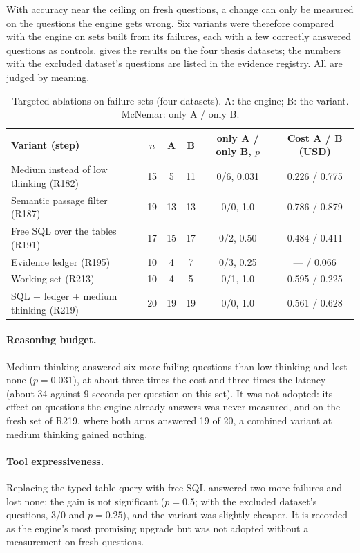 With accuracy near the ceiling on fresh questions, a change can only be measured on the questions the engine gets
wrong. Six variants were therefore compared with the engine on sets built from its failures, each with a few
correctly answered questions as controls.  gives the results on the four thesis datasets; the
numbers with the excluded dataset's questions are listed in the evidence registry. All are judged by meaning.

\begin{table}[htbp]
\centering
\caption{Targeted ablations on failure sets (four datasets). A: the engine; B: the variant. McNemar: only A / only B.}
\label{tab:ablations}
\small
\begin{tabularx}{\linewidth}{@{}>{\raggedright}Xccccc@{}}
\toprule
Variant (step) & $n$ & A & B & only A / only B, $p$ & Cost A / B (USD) \\
\midrule
Medium instead of low thinking (R182) & 15 & 5 & 11 & 0/6, 0.031 & 0.226 / 0.775 \\
Semantic passage filter (R187) & 19 & 13 & 13 & 0/0, 1.0 & 0.786 / 0.879 \\
Free SQL over the tables (R191) & 17 & 15 & 17 & 0/2, 0.50 & 0.484 / 0.411 \\
Evidence ledger (R195) & 10 & 4 & 7 & 0/3, 0.25 & --- / 0.066 \\
Working set (R213) & 10 & 4 & 5 & 0/1, 1.0 & 0.595 / 0.225 \\
SQL + ledger + medium thinking (R219) & 20 & 19 & 19 & 0/0, 1.0 & 0.561 / 0.628 \\
\bottomrule
\end{tabularx}
\end{table}

\paragraph{Reasoning budget.} Medium thinking answered six more failing questions than low thinking and lost none
($p = 0.031$), at about three times the cost and three times the latency (about 34 against 9 seconds per question on
this set). It was not adopted: its effect on questions the engine already answers was never measured, and on the fresh
set of R219, where both arms answered 19 of 20, a combined variant at medium thinking gained nothing.

\paragraph{Tool expressiveness.} Replacing the typed table query with free SQL answered two more failures and lost
none; the gain is not significant ($p = 0.5$; with the excluded dataset's questions, 3/0 and $p = 0.25$), and the
variant was slightly cheaper. It is recorded as the engine's most promising upgrade but was not adopted without a
measurement on fresh questions.

